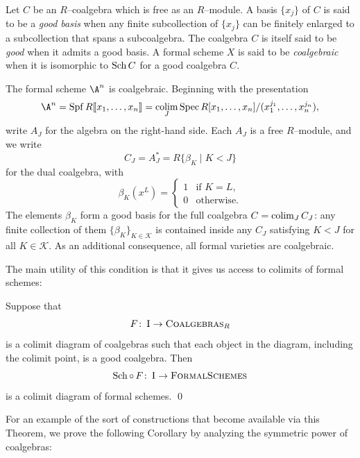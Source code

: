 \begin{definition}\label{DefnCoalgebraicFormalScheme}
Let \(C\) be an \(R\)--coalgebra which is free as an \(R\)--module.
A basis \(\{x_j\}\) of \(C\) is said to be a \textit{good basis} when any finite subcollection of \(\{x_j\}\) can be finitely enlarged to a subcollection that spans a subcoalgebra.
The coalgebra \(C\) is itself said to be \textit{good} when it admits a good basis.
A formal scheme \(X\) is said to be \textit{coalgebraic} when it is isomorphic to \(\operatorname{Sch} C\) for a good coalgebra \(C\).
\end{definition}

\begin{example}\label{FVarsAreCoalgebraic}
The formal scheme \(\A^n\) is coalgebraic.
Beginning with the presentation \[\A^n = \Spf R\ps{x_1, \ldots, x_n} = \colim_J \Spec R[x_1, \ldots, x_n] / (x_1^{j_1}, \ldots, x_n^{j_n}),\] write \(A_J\) for the algebra on the right-hand side.
Each \(A_J\) is a free \(R\)--module, and we write \[C_J = A_J^* = R\{\beta_K \mid K < J\}\] for the dual coalgebra, with \[\beta_K(x^L) = \begin{cases} 1 & \text{if \(K = L\)}, \\ 0 & \text{otherwise}. \end{cases}\]
The elements \(\beta_K\) form a good basis for the full coalgebra \(C = \operatorname*{colim}_J C_J\): any finite collection of them \(\{\beta_K\}_{K \in \mathcal K}\) is contained inside any \(C_J\) satisfying \(K < J\) for all \(K \in \mathcal K\).
As an additional consequence, all formal varieties are coalgebraic.
\end{example}

The main utility of this condition is that it gives us access to colimits of formal schemes:

\begin{theorem}\label{CoalgebraicColimitsExist}
Suppose that \[F\colon\thinspace \normalfont\textsc{I} \to \normalfont\textsc{Coalgebras}_R\] is a colimit diagram of coalgebras such that each object in the diagram, including the colimit point, is a good coalgebra.
Then \[\operatorname{Sch} \circ \, F\colon\thinspace \normalfont\textsc{I} \to \normalfont\textsc{FormalSchemes}\] is a colimit diagram of formal schemes. \qed
\end{theorem}

\noindent For an example of the sort of constructions that become available via this Theorem, we prove the following Corollary by analyzing the symmetric power of coalgebras:

